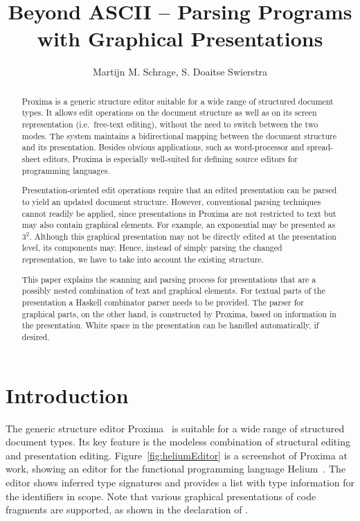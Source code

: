 \documentclass[12pt]{article}
\title{Beyond ASCII -- Parsing Programs with Graphical Presentations}
\author{Martijn M. Schrage\inst{1}, S. Doaitse Swierstra\inst{1}}
\begin{document}
 

\maketitle

\begin{abstract}

Proxima is a generic structure editor suitable for a wide range of structured document types. It allows edit operations on the document structure as well as on its screen representation (i.e.\ free-text editing), without the need to switch between the two modes. The system maintains a bidirectional mapping between the document structure and its presentation. Besides obvious applications, such as word-processor and spread-sheet editors, Proxima is especially well-suited for defining source editors for programming languages.

Presentation-oriented edit operations require that an edited presentation can be parsed to yield an updated document structure. However, conventional parsing techniques cannot readily be applied, since presentations in Proxima are not restricted to text but may also contain graphical elements. For example, an exponential may be presented as $3^2$. Although this graphical presentation may not be directly edited at the presentation level, its components may. Hence, instead of simply parsing the changed representation, we have to take into account the existing structure. 

This paper explains the scanning and parsing process for presentations that are a possibly nested combination of text and graphical elements. For textual parts of the presentation a Haskell combinator parser needs to be provided. The parser for graphical parts, on the other hand, is constructed by Proxima, based on information in the presentation. White space in the presentation can be handled automatically, if desired. 
\end{abstract}


\section{Introduction}\label{sect:introduction}

The generic structure editor Proxima~\cite{schrage04Proxima} is suitable for a wide range of structured document types. Its key feature is the modeless combination of structural editing and presentation editing. Figure~\ref{fig:heliumEditor} is a screenshot of Proxima at work, showing an editor for the functional programming language Helium~\cite{heeren03helium}. The editor shows inferred type signatures and provides a list with type information for the identifiers in scope. Note that various graphical presentations of code fragments are supported, as shown in the declaration of .
\end{document}
